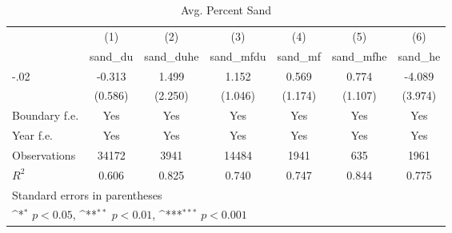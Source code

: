 \begin{table}[htbp]\centering
\def\sym#1{\ifmmode^{#1}\else\(^{#1}\)\fi}
\caption{Avg. Percent Sand}
\begin{tabular}{l*{6}{c}}
\hline\hline
                    &\multicolumn{1}{c}{(1)}&\multicolumn{1}{c}{(2)}&\multicolumn{1}{c}{(3)}&\multicolumn{1}{c}{(4)}&\multicolumn{1}{c}{(5)}&\multicolumn{1}{c}{(6)}\\
                    &\multicolumn{1}{c}{sand\_du}&\multicolumn{1}{c}{sand\_duhe}&\multicolumn{1}{c}{sand\_mfdu}&\multicolumn{1}{c}{sand\_mf}&\multicolumn{1}{c}{sand\_mfhe}&\multicolumn{1}{c}{sand\_he}\\
\hline
-.02                &      -0.313         &       1.499         &       1.152         &       0.569         &       0.774         &      -4.089         \\
                    &     (0.586)         &     (2.250)         &     (1.046)         &     (1.174)         &     (1.107)         &     (3.974)         \\
[1em]
Boundary f.e.       &         Yes         &         Yes         &         Yes         &         Yes         &         Yes         &         Yes         \\
[1em]
Year f.e.           &         Yes         &         Yes         &         Yes         &         Yes         &         Yes         &         Yes         \\
\hline
Observations        &       34172         &        3941         &       14484         &        1941         &         635         &        1961         \\
\(R^{2}\)           &       0.606         &       0.825         &       0.740         &       0.747         &       0.844         &       0.775         \\
\hline\hline
\multicolumn{7}{l}{\footnotesize Standard errors in parentheses}\\
\multicolumn{7}{l}{\footnotesize \sym{*} \(p<0.05\), \sym{**} \(p<0.01\), \sym{***} \(p<0.001\)}\\
\end{tabular}
\end{table}
